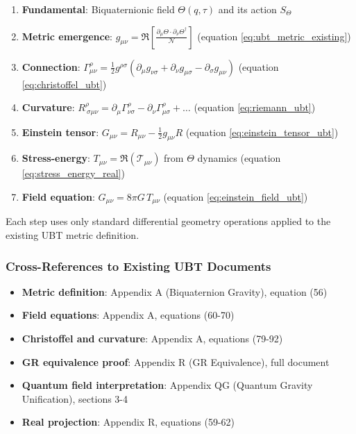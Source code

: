 \documentclass[12pt]{article}
\theoremstyle{definition}
\theoremstyle{remark}
\begin{document}
\begin{enumerate}
    \item \textbf{Fundamental}: Biquaternionic field $\Theta(q,\tau)$ and its action $S_\Theta$
    
    \item \textbf{Metric emergence}: $g_{\mu\nu} = \Re\left[\frac{\partial_\mu\Theta \cdot \partial_\nu\Theta^\dagger}{\mathcal{N}}\right]$ (equation \ref{eq:ubt_metric_existing})
    
    \item \textbf{Connection}: $\Gamma^\rho_{\mu\nu} = \frac{1}{2}g^{\rho\sigma}(\partial_\mu g_{\nu\sigma} + \partial_\nu g_{\mu\sigma} - \partial_\sigma g_{\mu\nu})$ (equation \ref{eq:christoffel_ubt})
    
    \item \textbf{Curvature}: $R^\rho_{\ \sigma\mu\nu} = \partial_\mu\Gamma^\rho_{\nu\sigma} - \partial_\nu\Gamma^\rho_{\mu\sigma} + \ldots$ (equation \ref{eq:riemann_ubt})
    
    \item \textbf{Einstein tensor}: $G_{\mu\nu} = R_{\mu\nu} - \frac{1}{2}g_{\mu\nu}R$ (equation \ref{eq:einstein_tensor_ubt})
    
    \item \textbf{Stress-energy}: $T_{\mu\nu} = \Re(\mathcal{T}_{\mu\nu})$ from $\Theta$ dynamics (equation \ref{eq:stress_energy_real})
    
    \item \textbf{Field equation}: $G_{\mu\nu} = 8\pi G \, T_{\mu\nu}$ (equation \ref{eq:einstein_field_ubt})
\end{enumerate}

Each step uses only standard differential geometry operations applied to the existing UBT metric definition.

\subsubsection{Cross-References to Existing UBT Documents}

\begin{itemize}
    \item \textbf{Metric definition}: Appendix A (Biquaternion Gravity), equation (56)
    \item \textbf{Field equations}: Appendix A, equations (60-70)
    \item \textbf{Christoffel and curvature}: Appendix A, equations (79-92)
    \item \textbf{GR equivalence proof}: Appendix R (GR Equivalence), full document
    \item \textbf{Quantum field interpretation}: Appendix QG (Quantum Gravity Unification), sections 3-4
    \item \textbf{Real projection}: Appendix R, equations (59-62)
\end{itemize}
\end{document}
